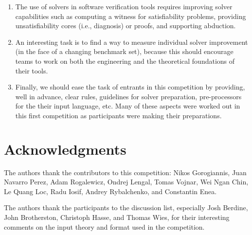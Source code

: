 \documentclass[twoside,11pt]{article}
\begin{document}
\begin{enumerate}
\item The use of solvers in software verification tools requires improving solver capabilities such as
computing a witness for satisfiability problems,
providing unsatisfiability cores (i.e., diagnosis) or proofs,
and supporting abduction.

\item An interesting task is to find a way to measure individual solver improvement (in the face of a changing benchmark set), because this should encourage teams to work on both the engineering and the theoretical foundations of their tools.
% 

\item Finally, we should ease the task of entrants in this competition by providing, well in advance, clear rules, guidelines for solver preparation, pre-processors for the their input language, etc. Many of these aspects were worked out in this first competition as participants were making their preparations.

\end{enumerate}


\section*{Acknowledgments}

The authors thank the contributors to this competition:
Nikos Gorogiannis, 
Juan Navarro Perez, 
Adam Rogalewicz, Ondrej Lengal, Tomas Vojnar, 
Wei Ngan Chin, Le Quang Loc, 
Radu Iosif, 
Andrey Rybalchenko, and
Constantin Enea.

The authors thank the participants to the discussion list, especially 
Josh Berdine, John Brotherston, Christoph Hasse, and Thomas Wies, 
for their interesting comments on the input theory and format used in the competition.





\end{document}
